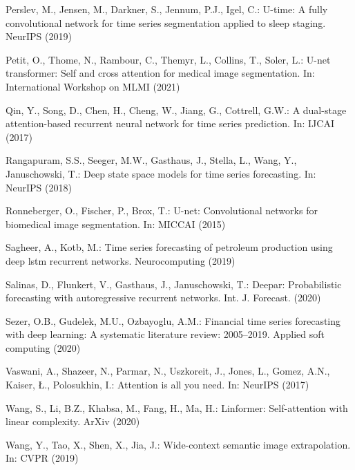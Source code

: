 \documentclass[runningheads]{llncs}
\begin{document}
\begin{thebibliography}{10}
    Perslev, M., Jensen, M., Darkner, S., Jennum, P.J., Igel, C.: U-time: A fully
      convolutional network for time series segmentation applied to sleep staging.
      NeurIPS  (2019)
    
    Petit, O., Thome, N., Rambour, C., Themyr, L., Collins, T., Soler, L.: U-net
      transformer: Self and cross attention for medical image segmentation. In:
      International Workshop on MLMI (2021)
    
    Qin, Y., Song, D., Chen, H., Cheng, W., Jiang, G., Cottrell, G.W.: A dual-stage
      attention-based recurrent neural network for time series prediction. In:
      IJCAI (2017)
    
    Rangapuram, S.S., Seeger, M.W., Gasthaus, J., Stella, L., Wang, Y.,
      Januschowski, T.: Deep state space models for time series forecasting. In:
      NeurIPS (2018)
    
    Ronneberger, O., Fischer, P., Brox, T.: U-net: Convolutional networks for
      biomedical image segmentation. In: MICCAI (2015)
    
    Sagheer, A., Kotb, M.: Time series forecasting of petroleum production using
      deep lstm recurrent networks. Neurocomputing  (2019)
    
    Salinas, D., Flunkert, V., Gasthaus, J., Januschowski, T.: Deepar:
      Probabilistic forecasting with autoregressive recurrent networks. Int. J.
      Forecast.  (2020)
    
    Sezer, O.B., Gudelek, M.U., Ozbayoglu, A.M.: Financial time series forecasting
      with deep learning: A systematic literature review: 2005--2019. Applied soft
      computing  (2020)
    
    Vaswani, A., Shazeer, N., Parmar, N., Uszkoreit, J., Jones, L., Gomez, A.N.,
      Kaiser, {\L}., Polosukhin, I.: Attention is all you need. In: NeurIPS (2017)
    
    Wang, S., Li, B.Z., Khabsa, M., Fang, H., Ma, H.: Linformer: Self-attention
      with linear complexity. ArXiv  (2020)
    
    Wang, Y., Tao, X., Shen, X., Jia, J.: Wide-context semantic image
      extrapolation. In: CVPR (2019)
    

\end{thebibliography}
\end{document}
